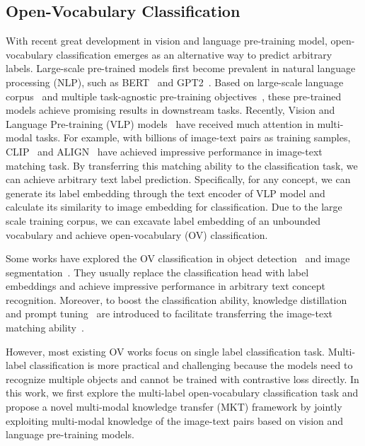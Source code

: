 \documentclass[letterpaper]{article} \usepackage{aaai23}  \usepackage{times}  \usepackage{helvet}  \usepackage{courier}  \usepackage[hyphens]{url}  \usepackage{graphicx} \urlstyle{rm} \def\UrlFont{\rm}  \usepackage{natbib}  \usepackage{caption} \frenchspacing  \setlength{\pdfpagewidth}{8.5in}  \setlength{\pdfpageheight}{11in}
\begin{document}
\subsection{Open-Vocabulary Classification} 
With recent great development in vision and language pre-training model, open-vocabulary  classification emerges as an alternative way to predict arbitrary labels.
Large-scale pre-trained models first become prevalent in natural language processing (NLP), such as BERT~\cite{devlin2018bert} and GPT2~\cite{radford2019language}.
Based on large-scale language corpus~\cite{raffel2020exploring} and multiple task-agnostic pre-training objectives~\cite{devlin2018bert}, these pre-trained models achieve promising results in downstream tasks.
Recently, Vision and Language Pre-training (VLP) models~\cite{ViLBERT, chen2020uniter, li2020unicoder, li2020oscar, kim2021vilt} have received much attention in multi-modal tasks. 
For example, with billions of image-text pairs as training samples, CLIP~\cite{clip} and ALIGN~\cite{align} have achieved impressive performance in image-text matching task.
By transferring this matching ability to the classification task, we can achieve arbitrary text label prediction.
Specifically, for any concept, we can generate its label embedding through the text encoder of VLP model and calculate its similarity to image embedding for classification.
Due to the large scale training corpus, we can excavate label embedding of an unbounded vocabulary and achieve open-vocabulary (OV) classification. \par
Some works have explored the OV classification in object detection~\cite{ovrcnn, openvild, openprompt, openonstage, opendetr} and image segmentation~\cite{opensedo, openseg}. 
They usually replace the classification head with label embeddings and achieve impressive performance in arbitrary text concept recognition. 
Moreover, to boost the classification ability, knowledge distillation~\cite{hinton2015distilling} and prompt tuning~\cite{li2021prefix} are introduced to facilitate transferring the image-text matching ability~\cite{coop}. \par
However, most existing OV works focus on single label classification task.
Multi-label classification is more practical and challenging because the models need to recognize multiple objects and cannot be trained with contrastive loss directly.
In this work, we first explore the multi-label open-vocabulary classification task and propose a novel multi-modal knowledge transfer (MKT) framework by jointly exploiting multi-modal knowledge of the image-text pairs based on vision and language pre-training models.  
\end{document}
